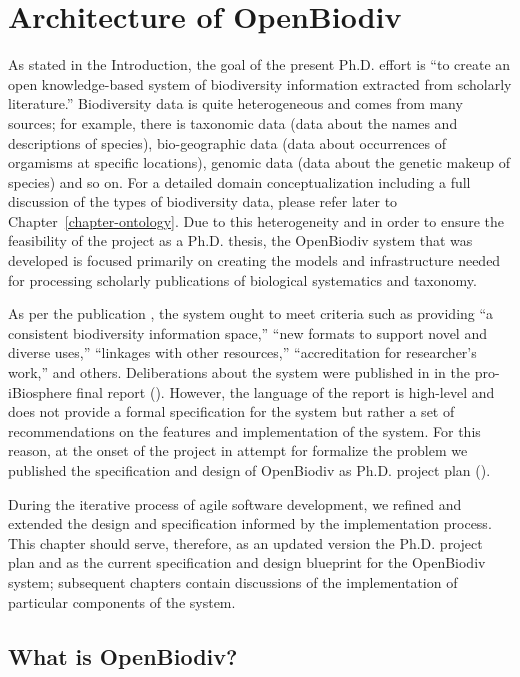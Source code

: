 \chapter{Architecture of OpenBiodiv}
\label{chapter-openbiodiv}

As stated in the Introduction, the goal of the present Ph.D. effort is ``to create an open knowledge-based system of biodiversity information extracted from scholarly literature.'' Biodiversity data is quite heterogeneous and comes from many sources; for example, there is taxonomic data (data about the names and descriptions of species), bio-geographic data (data about occurrences of orgamisms at specific locations), genomic data (data about the genetic makeup of species) and so on. For a detailed domain conceptualization including a full discussion of the types of biodiversity data, please refer later to Chapter~\ref{chapter-ontology}. Due to this heterogeneity and in order to ensure the feasibility of the project as a Ph.D. thesis, the OpenBiodiv system that was developed is focused primarily on creating the models and infrastructure needed for processing scholarly publications of biological systematics and taxonomy. 

As per the publication \cite{noauthor_open_2014}, the system ought to meet criteria such as providing ``a consistent biodiversity information space,'' ``new formats to support novel and diverse uses,'' ``linkages with other resources,'' ``accreditation for researcher's work,'' and others. Deliberations about the system were published in in the pro-iBiosphere final report (\cite{noauthor_pro-ibiosphere_2014}). However, the language of the report is high-level and does not provide a formal specification for the system but rather a set of recommendations on the features and implementation of the system. For this reason, at the onset of the project in attempt for formalize the problem we published the specification and design of OpenBiodiv as Ph.D. project plan (\cite{senderov_open_2016}).

During the iterative process of agile software development, we refined and extended the design and specification informed by the implementation process. This chapter should serve, therefore, as an updated version the Ph.D. project plan and as the current specification and design blueprint for the OpenBiodiv system; subsequent chapters contain discussions of the implementation of particular components of the system.

\section{What is OpenBiodiv?}

